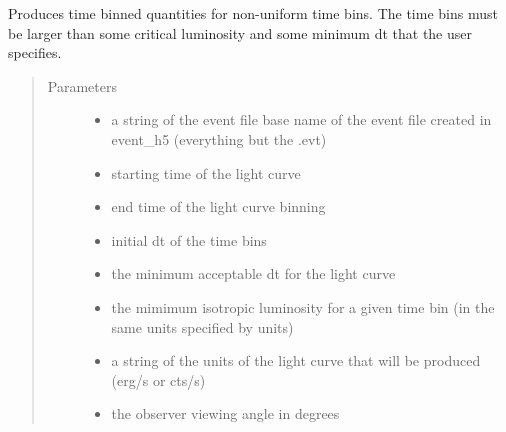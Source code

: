 \documentclass[letterpaper,10pt,english]{sphinxmanual}
\begin{document}
\begin{fulllineitems}
\label{\detokenize{mclib:mclib.lcur_var_t}}
Produces time binned quantities for non-uniform time bins. The time bins must be larger than some critical
luminosity and some minimum dt that the user specifies.
\begin{quote}\begin{description}
\item[{Parameters}] \leavevmode\begin{itemize}
\item {} 
 \textendash{} a string of the event file base name of the event file created in event\_h5 (everything but the .evt)

\item {} 
 \textendash{} starting time of the light curve

\item {} 
 \textendash{} end time of the light curve binning

\item {} 
 \textendash{} initial dt of the time bins

\item {} 
 \textendash{} the minimum acceptable dt for the light curve

\item {} 
 \textendash{} the mimimum isotropic luminosity for a given time bin (in the same units specified by units)

\item {} 
 \textendash{} a string of the units of the light curve that will be produced (erg/s or cts/s)

\item {} 
 \textendash{} the observer viewing angle in degrees


\end{itemize}
\end{description}
\end{quote}
\end{fulllineitems}
\end{document}

